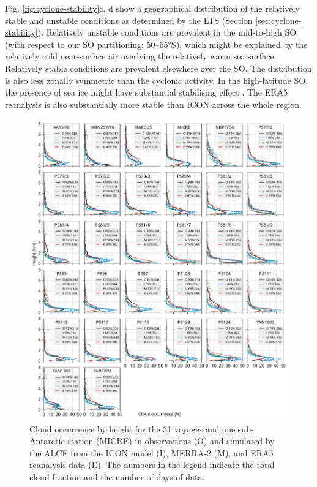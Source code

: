 \documentclass[12pt,a4paper]{article}
\begin{document}
Fig. \ref{fig:cyclone-stability}c, d show a geographical distribution of the
relatively stable and unstable conditions as determined by the LTS (Section
\ref{sec:cyclone-stability}). Relatively unstable conditions are prevalent
in the mid-to-high SO (with respect to our SO partitioning; 50--65°S), which might be explained by the relatively cold
near-surface air overlying the relatively warm sea surface. Relatively
stable conditions are prevalent elsewhere over the SO. The distribution is also
less zonally symmetric than the cyclonic activity.  In the high-latitude SO,
the presence of sea ice might have substantial stabilising effect
\citep{knight2024}. The ERA5 reanalysis is also substantially more stable than
ICON across the whole region.

\begin{figure}[p!]
\centerline{
\includegraphics[width=1.06\textwidth]{img/cloud_occurrence_panel.pdf}
}
\caption{
Cloud occurrence by height for the 31 voyages and one sub-Antarctic
station (MICRE) in observations (O) and simulated by the ALCF from the ICON
model (I), MERRA‐2 (M), and ERA5 reanalysis data (E). The numbers in the legend
indicate the total cloud fraction and the number of days of data.
}
\label{fig:cloud-occurrence-panel}
\end{figure}
\end{document}
